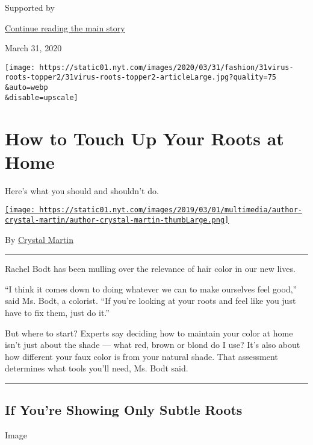Supported by

\protect\hyperlink{after-sponsor}{Continue reading the main story}

March 31, 2020

\texttt{[image: https://static01.nyt.com/images/2020/03/31/fashion/31virus-roots-topper2/31virus-roots-topper2-articleLarge.jpg?quality=75\\\&auto=webp\\\&disable=upscale]}

\hypertarget{how-to-touch-up-your-roots-at-home}{%
\section{How to Touch Up Your Roots at
Home}\label{how-to-touch-up-your-roots-at-home}}

Here's what you should and shouldn't do.

\href{https://www.nytimes.com/by/crystal-martin}{\texttt{[image: https://static01.nyt.com/images/2019/03/01/multimedia/author-crystal-martin/author-crystal-martin-thumbLarge.png]}}

By \href{https://www.nytimes.com/by/crystal-martin}{Crystal Martin}

\begin{center}\rule{0.5\linewidth}{\linethickness}\end{center}

Rachel Bodt has been mulling over the relevance of hair color in our new
lives.

``I think it comes down to doing whatever we can to make ourselves feel
good,'' said Ms. Bodt, a colorist. ``If you're looking at your roots and
feel like you just have to fix them, just do it.''

But where to start? Experts say deciding how to maintain your color at
home isn't just about the shade --- what red, brown or blond do I use?
It's also about how different your faux color is from your natural
shade. That assessment determines what tools you'll need, Ms. Bodt said.

\begin{center}\rule{0.5\linewidth}{\linethickness}\end{center}

\hypertarget{if-youre-showing-only-subtle-roots}{%
\subsection{If You're Showing Only Subtle
Roots}\label{if-youre-showing-only-subtle-roots}}

Image

